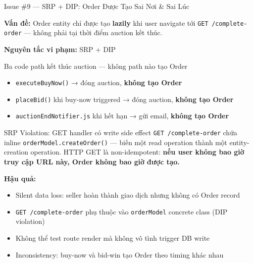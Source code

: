 \documentclass[12pt]{beamer}
\begin{document}
\begin{frame}{Issue \#9 — SRP + DIP: Order Được Tạo Sai Nơi \& Sai Lúc}

  \textbf{Vấn đề:} Order entity chỉ được tạo \textbf{lazily} khi user navigate tới
  \texttt{GET /complete-order} — không phải tại thời điểm auction kết thúc.

  \bigskip
  \textbf{Nguyên tắc vi phạm:} \alert{SRP} + \alert{DIP}

  \bigskip
  \begin{block}{Ba code path kết thúc auction — không path nào tạo Order}
    \begin{itemize}
      \item \texttt{executeBuyNow()} → đóng auction, \textbf{không tạo Order}
      \item \texttt{placeBid()} khi buy-now triggered → đóng auction, \textbf{không tạo Order}
      \item \texttt{auctionEndNotifier.js} khi hết hạn → gửi email, \textbf{không tạo Order}
    \end{itemize}
  \end{block}

  \medskip
  \begin{alertblock}{SRP Violation: GET handler có write side effect}
    \texttt{GET /complete-order} chứa inline \texttt{orderModel.createOrder()} —
    biến một read operation thành một entity-creation operation.
    HTTP GET là non-idempotent: \textbf{nếu user không bao giờ truy cập URL này,
    Order không bao giờ được tạo.}
  \end{alertblock}

  \medskip
  \textbf{Hậu quả:}
  \begin{itemize}
    \item Silent data loss: seller hoàn thành giao dịch nhưng không có Order record
    \item \texttt{GET /complete-order} phụ thuộc vào \texttt{orderModel} concrete class (DIP violation)
    \item Không thể test route render mà không vô tình trigger DB write
    \item Inconsistency: buy-now và bid-win tạo Order theo timing khác nhau
  \end{itemize}
\end{frame}
\end{document}
